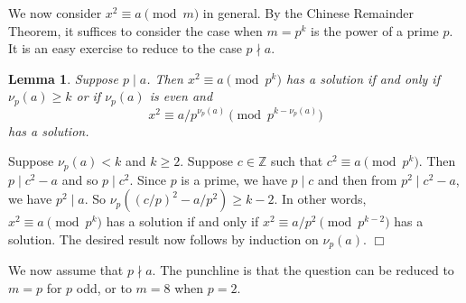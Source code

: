 \documentclass{article}
\def\Z{{\mathbb Z}}
\def\Z{{\mathbb Z}}
\newtheorem{lemma}[subsection]{Lemma}
\newenvironment{proof}{\noindent {\bf Proof:}}{$\Box$ \vspace{2 ex}}
\begin{document}
\begin{comment}
    \noindent\textbf{Proof of Proposition \ref{prop:qr2}}: In light of quadratic reciprocity, it remains to prove that $p^* = (-1)^{(p-1)/2}p$ is a square mod $q$ if and only if $p\equiv \pm a^2\pmod{4q}$ for some odd integer $a$. This is basically just the definition.

If $p\equiv 1\pmod{4}$, then $p^* = p$. If $p$ is a square mod $q$, then $p\equiv b^2\pmod{q}$ for some integer $b$. By Chinese remainder theorem, there exists an integer $a$ that is 1 mod 4 and $b$ mod $q$. So $p\equiv a^2\pmod{4q}$. Since $p$ is odd and $4q$ is even, we have $a$ is odd. Conversely, if $p\equiv \pm a^2\pmod{4q}$ for some odd integer $a$. If $p\equiv -a^2\pmod{4q}$, then $p\equiv -a^2\pmod{4}$ but $a^2\equiv p \equiv 1\pmod{4}$, which is impossible. So $p\equiv a^2\pmod{4q}$ and thus $p\equiv a^2\pmod{q}$.

The case for $p\equiv 3\pmod{4}$ is similar. \hspace{20pt}$\Box$
\end{comment}

We now consider $x^2 \equiv a\pmod{m}$ in general. By the Chinese Remainder Theorem, it suffices to consider the case when $m = p^k$ is the power of a prime $p$. It is an easy exercise to reduce to the case $p\nmid a$.

\begin{lemma}
    Suppose $p\mid a$. Then $x^2 \equiv a\pmod{p^k}$ has a solution if and only if $\nu_p(a)\geq k$ or if $\nu_p(a)$ is even and $$x^2\equiv a/p^{\nu_p(a)}\pmod{p^{k-\nu_p(a)}}$$ has a solution.
\end{lemma}

\begin{proof}
    Suppose $\nu_p(a) < k$ and $k\geq 2$. Suppose $c\in\Z$ such that $c^2\equiv a\pmod{p^k}$. Then $p\mid c^2 - a$ and so $p\mid c^2$. Since $p$ is a prime, we have $p\mid c$ and then from $p^2\mid c^2 - a$, we have $p^2\mid a$. So $\nu_p((c/p)^2 - a/p^2) \geq k - 2.$ In other words, $x^2\equiv a\pmod{p^k}$ has a solution if and only if $x^2\equiv a/p^2\pmod{p^{k-2}}$ has a solution. The desired result now follows by induction on $\nu_p(a)$.
\end{proof}

We now assume that $p\nmid a$. The punchline is that the question can be reduced to $m = p$ for $p$ odd, or to $m = 8$ when $p = 2$.
\end{document}
